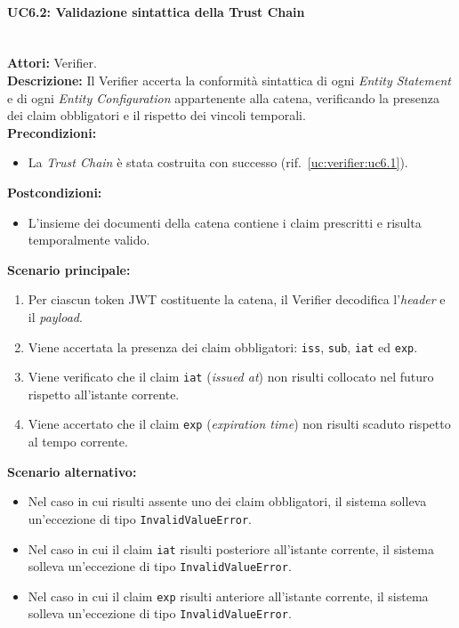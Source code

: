 \paragraph{\large\bfseries UC6.2: Validazione sintattica della Trust Chain}
\label{uc:verifier:uc6.2}
\mbox{}\\
\noindent\textbf{Attori:} Verifier.
\\
\noindent\textbf{Descrizione:} Il Verifier accerta la conformità sintattica di ogni \textit{Entity Statement} e di ogni \textit{Entity Configuration} appartenente alla catena, verificando la presenza dei claim obbligatori e il rispetto dei vincoli temporali.
\\
\noindent\textbf{Precondizioni:}
\begin{itemize}
    \item La \textit{Trust Chain} è stata costruita con successo (rif.\ \ref{uc:verifier:uc6.1}).
\end{itemize}
\noindent\textbf{Postcondizioni:}
\begin{itemize}
    \item L'insieme dei documenti della catena contiene i claim prescritti e risulta temporalmente valido.
\end{itemize}

\noindent\textbf{Scenario principale:}
\begin{enumerate}
    \item Per ciascun token JWT costituente la catena, il Verifier decodifica l'\textit{header} e il \textit{payload}.
    \item Viene accertata la presenza dei claim obbligatori: \texttt{iss}, \texttt{sub}, \texttt{iat} ed \texttt{exp}.
    \item Viene verificato che il claim \texttt{iat} (\textit{issued at}) non risulti collocato nel futuro rispetto all'istante corrente.
    \item Viene accertato che il claim \texttt{exp} (\textit{expiration time}) non risulti scaduto rispetto al tempo corrente.
\end{enumerate}

\noindent\textbf{Scenario alternativo:}
\begin{itemize}
    \item Nel caso in cui risulti assente uno dei claim obbligatori, il sistema solleva un'eccezione di tipo \texttt{InvalidValueError}.
    \item Nel caso in cui il claim \texttt{iat} risulti posteriore all'istante corrente, il sistema solleva un'eccezione di tipo \texttt{InvalidValueError}.
    \item Nel caso in cui il claim \texttt{exp} risulti anteriore all'istante corrente, il sistema solleva un'eccezione di tipo \texttt{InvalidValueError}.
\end{itemize}

